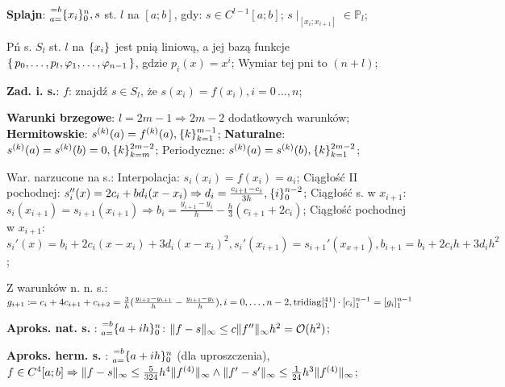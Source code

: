 
\entry
\textbf{Splajn}:
$\ipoints[0][n][a=][=b]{x_i}, s$
st. $l$ na $[a;b]$, gdy:
$s\in C^{l-1}[a;b]$;
$s\mid_{[x_i;x_{i+1}]} \in \mathbb{P}_l$;

\entry
Pń s. $S_l$ st. $l$ na $\ipoints{x_i}$ jest pnią liniową,
a jej bazą funkcje
$\set{p_0, \ldots, p_l, \varphi_1, \ldots, \varphi_{n-1}}$,
gdzie $p_i(x)=x^i$;
\entry
Wymiar tej pni to $(n+l)$;

\entry
\textbf{Zad. i. s.}:
$f$: znajdź $s\in S_l$, że
$s(x_i)=f(x_i), i=0\,\dots,n$;

\entry
\textbf{Warunki brzegowe}:
$l=2m-1 \Rightarrow 2m-2$ dodatkowych warunków;
\entry
\textbf{Hermitowskie}:
$\deriv{s}{k}(a) = \deriv{f}{k}(a), \ipoints[k=1][m-1]{k}$;
\entry
\textbf{Naturalne}:
$\deriv{s}{k}(a)=\deriv{s}{k}(b)=0, \ipoints[k=m][2m-2]{k}$;
\entry
Periodyczne:
$\deriv{s}{k}(a)=\deriv{s}{k}(b), \ipoints[k=1][2m-2]{k}$;

\entry
War. narzucone na s.:
Interpolacja:
$s_i(x_i)=f(x_i)=a_i$;
Ciągłość II pochodnej:
$s_i''(x) = 2c_i+bd_i(x-x_i) \Rightarrow d_i=\frac{c_{i+1} - c_i}{3h}, \ipoints[0][n-2]{i}$;
Ciągłość s. w $x_{i+1}$:
$s_i(x_{i+1}) = s_{i+1}(x_{i+1}) \Rightarrow b_i = \frac{y_{i+1} - y_i}{h} - \frac{h}{3}(c_{i+1} + 2c_i)$;
Ciągłość pochodnej w $x_{i+1}$:
$
s_i'(x) = b_i +2c_i(x - x_i) + 3 d_i (x - x_i)^2,
s_i'(x_{i+1}) = s_{i+1}'(x_{x+1}),
b_{i+1} = b_i + 2 c_i h + 3 d_i h^2
$;

\entry
Z warunków n. n. s.:
$
g_{i+1} \coloneqq
c_i + 4c_{i+1} + c_{i+2} =
\frac{3}{h}(\frac{y_{i+2} - y_{i+1}}{h} - \frac{y_{i+1} - y_{i}}{h}),
i=0,\ldots, n-2,
\mathrm{tridiag}[\prescript{4}{1}{}^{1}] \cdot [c_i]^{n-1}_{1} = [g_i]^{n-1}_{1}
$

\entry
\textbf{Aproks. nat. s. \mancube}:
$\ipoints[0][n][a=][=b]{a+ih}$:
$\|f-s\|_\infty \leq c\|f''\|_\infty h^2 = \mathcal{O}(h^2)$;

\entry
\textbf{Aproks. herm. s. \mancube}:
$\ipoints[0][n][a=][=b]{a+ih}$
(dla uproszczenia),
$
f\in C^{4}[a;b]
\Rightarrow
\|f-s\|_\infty \leq \frac{5}{324} h^4 \|f^{(4)}\|_\infty
\wedge
\|f'-s'\|_\infty \leq \frac{1}{24} h^3 \|f^{(4)}\|_\infty
$;
